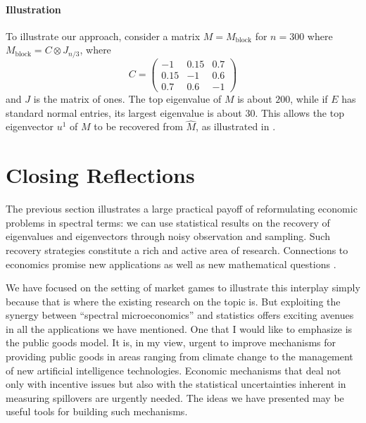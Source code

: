\documentclass{notices}
\theoremstyle{definition}\newtheorem{problem}{Problem}
\begin{document}
\paragraph{Illustration} To illustrate our approach, consider a matrix $M=M_{\text{block}}$ for $n=300$ 
where $M_{\text{block}} = C \otimes J_{n/3}$, where
\[ C = \begin{pmatrix} -1 & 0.15 & 0.7 \\ 0.15 & -1 & 0.6 \\ 0.7 & 0.6 & -1 \end{pmatrix} \]
and $J$ is the matrix of ones. The top eigenvalue of $M$ is about $200$, while if $E$ has standard normal entries, its largest eigenvalue is about $30$. This allows the top eigenvector $u^1$ of $M$ to be recovered from $\widehat{M}$, as illustrated in   .



\section*{Closing Reflections} 

The previous section illustrates a large practical payoff of reformulating economic problems in spectral terms: we can use statistical results on the recovery of eigenvalues and eigenvectors through noisy observation and sampling. Such recovery strategies constitute a rich and active area of research. Connections to economics promise new applications as well as new mathematical questions \cite{chen2021spectral}.

We have focused on the setting of market games to illustrate this interplay simply because that is where the existing research on the topic is. But exploiting the synergy between ``spectral microeconomics'' and statistics offers exciting avenues in all the applications we have mentioned. One that I would like to emphasize is the public goods model. It is, in my view, urgent to improve mechanisms for providing public goods in areas ranging from climate change to the management of new artificial intelligence technologies. Economic mechanisms that deal not only with incentive issues but also with the statistical uncertainties inherent in measuring spillovers are urgently needed. The ideas we have presented may be useful tools for building such mechanisms.


 






\end{document}

